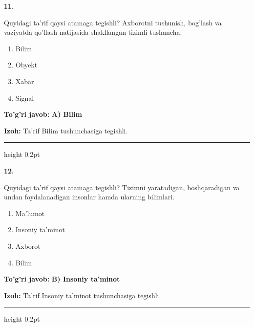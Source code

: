 \documentclass[10pt,a4paper,oneside]{article}
\begin{document}
\noindent\textbf{\color{ink}11.}
\par
Quyidagi ta'rif qaysi atamaga tegishli? Axborotni tushunish, bog'lash va vaziyatda qo'llash natijasida shakllangan tizimli tushuncha.
\begin{enumerate}[label=\Alph*),leftmargin=9mm]
\item Bilim
\item Obyekt
\item Xabar
\item Signal
\end{enumerate}
\begin{tcolorbox}[enhanced,breakable,colback=teal!4,colframe=teal!50!black,boxrule=0.5pt,arc=1.1mm,left=3mm,right=3mm,top=1.7mm,bottom=1.7mm,before skip=2mm,after skip=2mm]
\textbf{\color{teal}To'g'ri javob:} \textbf{A) Bilim}
\par\smallskip
\textbf{Izoh:} Ta'rif Bilim tushunchasiga tegishli.
\end{tcolorbox}
\vspace{2mm}\hrule height 0.2pt \vspace{3mm}

\noindent\textbf{\color{ink}12.}
\par
Quyidagi ta'rif qaysi atamaga tegishli? Tizimni yaratadigan, boshqaradigan va undan foydalanadigan insonlar hamda ularning bilimlari.
\begin{enumerate}[label=\Alph*),leftmargin=9mm]
\item Ma'lumot
\item Insoniy ta'minot
\item Axborot
\item Bilim
\end{enumerate}
\begin{tcolorbox}[enhanced,breakable,colback=teal!4,colframe=teal!50!black,boxrule=0.5pt,arc=1.1mm,left=3mm,right=3mm,top=1.7mm,bottom=1.7mm,before skip=2mm,after skip=2mm]
\textbf{\color{teal}To'g'ri javob:} \textbf{B) Insoniy ta'minot}
\par\smallskip
\textbf{Izoh:} Ta'rif Insoniy ta'minot tushunchasiga tegishli.
\end{tcolorbox}
\vspace{2mm}\hrule height 0.2pt \vspace{3mm}
\end{document}
